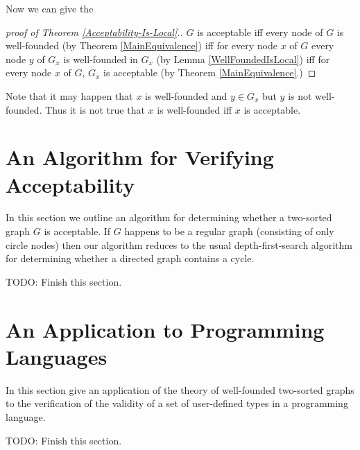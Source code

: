 \documentclass[oneside,12pt]{amsart}
\begin{document}
Now we can give the

\begin{proof}[proof of Theorem \ref{Acceptability-Is-Local}.]
$G$ is acceptable iff every node of $G$ is well-founded (by Theorem \ref{MainEquivalence})
iff for every node $x$ of $G$ every node $y$ of $G_x$ is well-founded in $G_x$ (by Lemma \ref{WellFoundedIsLocal})
iff for every node $x$ of $G$, $G_x$ is acceptable (by Theorem \ref{MainEquivalence}.)
\end{proof}

Note that it may happen that $x$ is well-founded and $y\in G_x$ but $y$ is not well-founded. Thus it is not true
that $x$ is well-founded iff $x$ is acceptable.


\section{An Algorithm for Verifying Acceptability}
In this section we outline an algorithm for determining whether a two-sorted graph $G$ is acceptable.
If $G$ happens to be a regular graph (consisting of only circle nodes) then our algorithm reduces
to the usual depth-first-search algorithm for determining whether a directed graph contains a cycle.

TODO: Finish this section.

\section{An Application to Programming Languages}
In this section give an application of the theory of well-founded two-sorted graphs to the verification of the validity
of a set of user-defined types in a programming language.

TODO: Finish this section.
\end{document}
